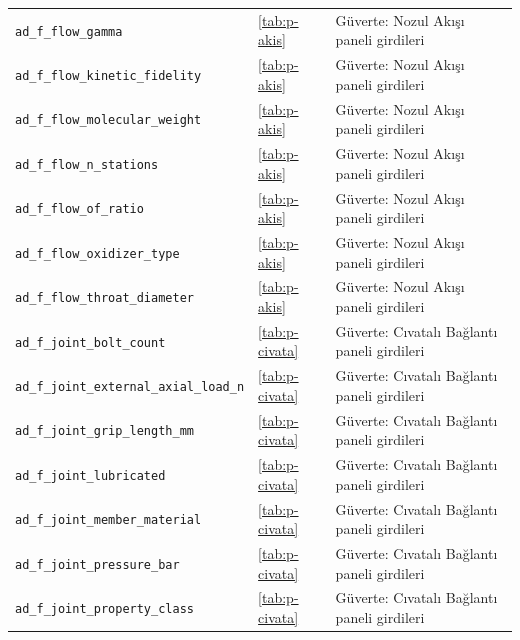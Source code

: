 \documentclass[11pt,a4paper]{article}
\begin{document}
{\begin{longtable}{@{}>{\raggedright\arraybackslash}p{5.2cm}p{1.4cm}>{\raggedright\arraybackslash}p{7.4cm}@{}}
\texttt{ad\_\allowbreak{}f\_\allowbreak{}flow\_\allowbreak{}gamma} & \ref{tab:p-akis} & Güverte: Nozul Akışı paneli girdileri \\
\texttt{ad\_\allowbreak{}f\_\allowbreak{}flow\_\allowbreak{}kinetic\_\allowbreak{}fidelity} & \ref{tab:p-akis} & Güverte: Nozul Akışı paneli girdileri \\
\texttt{ad\_\allowbreak{}f\_\allowbreak{}flow\_\allowbreak{}molecular\_\allowbreak{}weight} & \ref{tab:p-akis} & Güverte: Nozul Akışı paneli girdileri \\
\texttt{ad\_\allowbreak{}f\_\allowbreak{}flow\_\allowbreak{}n\_\allowbreak{}stations} & \ref{tab:p-akis} & Güverte: Nozul Akışı paneli girdileri \\
\texttt{ad\_\allowbreak{}f\_\allowbreak{}flow\_\allowbreak{}of\_\allowbreak{}ratio} & \ref{tab:p-akis} & Güverte: Nozul Akışı paneli girdileri \\
\texttt{ad\_\allowbreak{}f\_\allowbreak{}flow\_\allowbreak{}oxidizer\_\allowbreak{}type} & \ref{tab:p-akis} & Güverte: Nozul Akışı paneli girdileri \\
\texttt{ad\_\allowbreak{}f\_\allowbreak{}flow\_\allowbreak{}throat\_\allowbreak{}diameter} & \ref{tab:p-akis} & Güverte: Nozul Akışı paneli girdileri \\
\texttt{ad\_\allowbreak{}f\_\allowbreak{}joint\_\allowbreak{}bolt\_\allowbreak{}count} & \ref{tab:p-civata} & Güverte: Cıvatalı Bağlantı paneli girdileri \\
\texttt{ad\_\allowbreak{}f\_\allowbreak{}joint\_\allowbreak{}external\_\allowbreak{}axial\_\allowbreak{}load\_\allowbreak{}n} & \ref{tab:p-civata} & Güverte: Cıvatalı Bağlantı paneli girdileri \\
\texttt{ad\_\allowbreak{}f\_\allowbreak{}joint\_\allowbreak{}grip\_\allowbreak{}length\_\allowbreak{}mm} & \ref{tab:p-civata} & Güverte: Cıvatalı Bağlantı paneli girdileri \\
\texttt{ad\_\allowbreak{}f\_\allowbreak{}joint\_\allowbreak{}lubricated} & \ref{tab:p-civata} & Güverte: Cıvatalı Bağlantı paneli girdileri \\
\texttt{ad\_\allowbreak{}f\_\allowbreak{}joint\_\allowbreak{}member\_\allowbreak{}material} & \ref{tab:p-civata} & Güverte: Cıvatalı Bağlantı paneli girdileri \\
\texttt{ad\_\allowbreak{}f\_\allowbreak{}joint\_\allowbreak{}pressure\_\allowbreak{}bar} & \ref{tab:p-civata} & Güverte: Cıvatalı Bağlantı paneli girdileri \\
\texttt{ad\_\allowbreak{}f\_\allowbreak{}joint\_\allowbreak{}property\_\allowbreak{}class} & \ref{tab:p-civata} & Güverte: Cıvatalı Bağlantı paneli girdileri \\

\end{longtable}}
\end{document}
